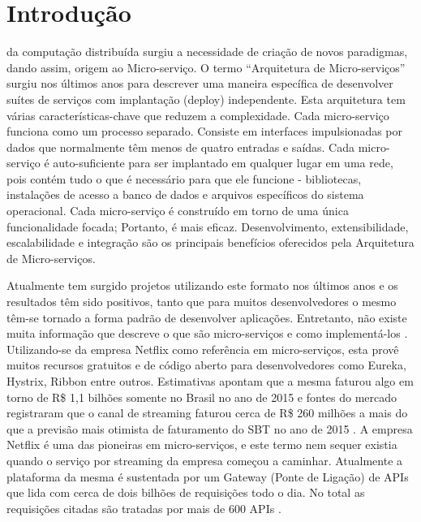\documentclass[journal]{IEEEtran}
\begin{document}
\section{Introdução}
% 
% 
% 
% 
 da computação distribuída  surgiu a necessidade de criação de novos paradigmas, dando assim, origem ao Micro-serviço. O termo “Arquitetura de Micro-serviços” surgiu nos últimos anos para descrever uma maneira específica de desenvolver suítes de serviços com implantação (deploy) independente. Esta arquitetura tem várias características-chave que reduzem a complexidade. Cada micro-serviço funciona como um processo separado. Consiste em interfaces impulsionadas por dados que normalmente têm menos de quatro entradas e saídas. Cada micro-serviço é auto-suficiente para ser implantado em qualquer lugar em uma rede, pois contém tudo o que é necessário para que ele funcione - bibliotecas, instalações de acesso a banco de dados e arquivos específicos do sistema operacional. Cada micro-serviço é construído em torno de uma única funcionalidade focada; Portanto, é mais eficaz. Desenvolvimento, extensibilidade, escalabilidade e integração são os principais benefícios oferecidos pela Arquitetura de Micro-serviços. 

Atualmente tem surgido projetos utilizando este formato nos últimos anos e os resultados têm sido positivos, tanto que para muitos desenvolvedores o mesmo têm-se tornado a forma padrão de desenvolver aplicações. Entretanto, não existe muita informação que descreve o que são micro-serviços e como implementá-los \cite{martinfowleretal}. Utilizando-se da empresa Netflix como referência em micro-serviços, esta provê  muitos recursos gratuitos e de código aberto para desenvolvedores como Eureka, Hystrix, Ribbon entre outros. Estimativas apontam que a mesma faturou algo em torno de R\$ 1,1 bilhões somente no Brasil no ano de 2015 e fontes do mercado registraram que o canal de streaming faturou cerca de R\$ 260 milhões a mais do que a previsão mais otimista de faturamento do SBT no ano de 2015 \cite{RicardoFeltrin}. A empresa Netflix é uma das pioneiras em micro-serviços, e este termo nem sequer existia quando o serviço por streaming da empresa começou a caminhar. Atualmente a plataforma da mesma é sustentada por um Gateway (Ponte de Ligação) de APIs que lida com cerca de dois bilhões de requisições todo o dia. No total as requisições citadas são tratadas por mais de 600 APIs \cite{SmartBear}. 
\end{document}
